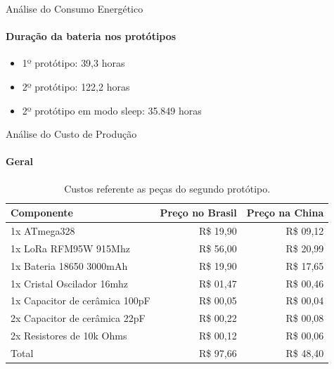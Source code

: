 \begin{frame}{Análise do Consumo Energético}
  \framesubtitle{Duração da bateria nos protótipos}
  \begin{itemize}
    \item 1º protótipo: \alert{39,3 horas}
    \item 2º protótipo: \alert{122,2 horas}
    \item 2º protótipo em modo sleep: \alert{35.849 horas}
  \end{itemize}
\end{frame}

\begin{frame}{Análise do Custo de Produção}
  \framesubtitle{\textcolor{fibeamer@black}{Geral}}
  \begin{table}[!b]{
    \scalebox{0.9} {
      \carlitoTLF %
      \begin{tabularx}{\textwidth}{lrr}
        \textbf{Componente}&\textbf{Preço no Brasil}&\textbf{Preço na China}\\
        \toprule
        1x ATmega328 & R\$ 19,90 & R\$ 09,12 \\
        1x LoRa RFM95W 915Mhz & R\$ 56,00 & R\$ 20,99 \\
        1x Bateria 18650 3000mAh & R\$ 19,90 & R\$ 17,65 \\
        1x Cristal Oscilador 16mhz & R\$ 01,47 & R\$ 00,46 \\
        1x Capacitor de cerâmica 100pF & R\$ 00,05 & R\$ 00,04 \\
        2x Capacitor de cerâmica 22pF & R\$ 00,22 & R\$ 00,08 \\
        2x Resistores de 10k Ohms & R\$ 00,12 & R\$ 00,06 \\
        \bottomrule
        \textnormal{\alert{Total}} & \alert{R\$ 97,66} & \alert{R\$ 48,40}
      \end{tabularx}
    }
  }
    \caption{Custos referente as peças do segundo protótipo.}
  \end{table}
\end{frame}